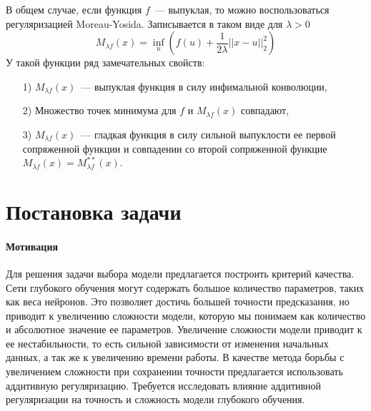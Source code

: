 \documentclass[12pt, twoside]{article}
\begin{document}
В общем случае, если функция $f$~--- выпуклая, то можно воспользоваться регуляризацией Moreau-Yosida. Записывается в таком виде для $\lambda > 0$
\begin{equation}
M_{\lambda f}(x) = \underset{u}\inf(f(u) + \frac{1}{2\lambda}||x - u||_2^2) 
\end{equation}
У такой функции ряд замечательных свойств:
\begin{enumerate}
    \item[1)] $M_{\lambda f}(x)$~--- выпуклая функция в силу инфимальной конволюции,\\
    \item[2)] Множество точек минимума для $f$ и $M_{\lambda f}(x)$ совпадают, \\
    \item[3)] $M_{\lambda f}(x)$~--- гладкая функция в силу сильной выпуклости ее первой сопряженной функции и совпадении со второй сопряженной функцие $M_{\lambda f}(x) = M_{\lambda f}^{**}(x)$. \\
\end{enumerate}


\section{Постановка задачи}
\paragraph{Мотивация}
Для решения задачи выбора модели предлагается построить критерий качества.
Сети глубокого обучения могут содержать большое количество параметров, таких как веса нейронов. Это позволяет достичь большей точности предсказания, но приводит к увеличению сложности модели, которую мы понимаем как количество и абсолютное значение ее параметров. Увеличение сложности модели приводит к ее нестабильности, то есть сильной зависимости от изменения начальных данных, а так же к увеличению времени работы. В качестве метода борьбы с увеличением сложности при сохранении точности предлагается использовать аддитивную регуляризацию. Требуется исследовать влияние аддитивной регуляризации на точность и сложность модели глубокого обучения. 
\end{document}
